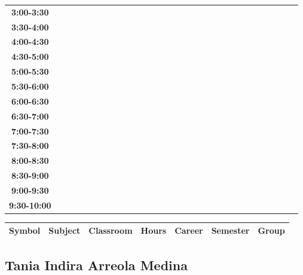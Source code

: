 \documentclass{article}
\begin{document}
\begin{table}[ht]
\begin{tabular}{|c|c|c|c|c|c|c|c|c|c|c|c|c|c|c|c|c|c|c|c|c|c|c|c|c|c|c|c|c|c|}
\textbf{3:00-3:30} &   &   &   &   &   &   &   \\
 \cline{1-8} 
\textbf{3:30-4:00} &   &   &   &   &   &   &   \\
 \cline{1-8} 
\textbf{4:00-4:30} &   &   &   &   &   &   &   \\
 \cline{1-8} 
\textbf{4:30-5:00} &   &   &   &   &   &   &   \\
 \cline{1-8} 
\textbf{5:00-5:30} &   &   &   &   &   &   &   \\
 \cline{1-8} 
\textbf{5:30-6:00} &   &   &   &   &   &   &   \\
 \cline{1-8} 
\textbf{6:00-6:30} &   &   &   &   &   &   &   \\
 \cline{1-8} 
\textbf{6:30-7:00} &   &   &   &   &   &   &   \\
 \cline{1-8} 
\textbf{7:00-7:30} &   &   &   &   &   &   &   \\
 \cline{1-8} 
\textbf{7:30-8:00} &   &   &   &   &   &   &   \\
 \cline{1-8} 
\textbf{8:00-8:30} &   &   &   &   &   &   &   \\
 \cline{1-8} 
\textbf{8:30-9:00} &   &   &   &   &   &   &   \\
 \cline{1-8} 
\textbf{9:00-9:30} &   &   &   &   &   &   &   \\
 \cline{1-8} 
\textbf{9:30-10:00} &   &   &   &   &   &   &   \\
 \cline{1-8} 
\end{tabular}\end{table}

        
        \begin{tabular}{|>{\centering\arraybackslash}m{2cm}|>{\centering\arraybackslash}m{4cm}|>{\centering\arraybackslash}m{2cm}|>{\centering\arraybackslash}m{2cm}|>{\centering\arraybackslash}m{2cm}|>{\centering\arraybackslash}m{2cm}|>{\centering\arraybackslash}m{2cm}|}
        \hline
        \textbf{Symbol} & \textbf{Subject} & \textbf{Classroom} & \textbf{Hours} & \textbf{Career} & \textbf{Semester} & \textbf{Group} \\
        \hline
        \end{tabular}
                    

        \newpage
        

        \subsection{Tania Indira Arreola Medina}
        \vspace*{.1cm}
        
\end{document}
